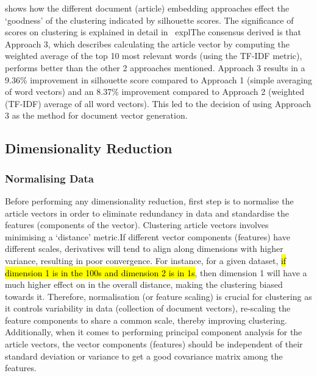  shows how the different document (article) embedding approaches effect the `goodness' of the clustering indicated by silhouette scores. The significance of scores on clustering is explained in detail in~ explThe consensus derived is that Approach 3, which describes calculating the article vector by computing the weighted average of the top 10 most relevant words (using the TF-IDF metric), performs better than the other 2 approaches mentioned. Approach 3 results in a 9.36\% improvement in silhouette score compared to Approach 1 (simple averaging of word vectors) and an 8.37\% improvement compared to Approach 2 (weighted (TF-IDF) average of all word vectors). This led to the decision of using Approach 3 as the method for document vector generation.



\subsection{Dimensionality Reduction}

\subsubsection{Normalising Data}

Before performing any dimensionality reduction, first step is to normalise the article vectors in order to eliminate redundancy in data and standardise the features (components of the vector). Clustering article vectors involves minimising a `distance' metric.If different vector components (features) have different scales, derivatives will tend to align along dimensions with higher variance, resulting in poor convergence. For instance, for a given dataset, \hl{if dimension 1 is in the 100s and dimension 2 is in 1s}, then dimension 1 will have a much higher effect on in the overall distance, making the clustering biased towards it. Therefore, normalisation (or feature scaling) is crucial for clustering as it controls variability in data (collection of document vectors), re-scaling the feature components to share a common scale, thereby improving clustering. Additionally, when it comes to performing principal component analysis for the article vectors, the vector components (features) should be independent of their standard deviation or variance to get a good covariance matrix among the features.   

